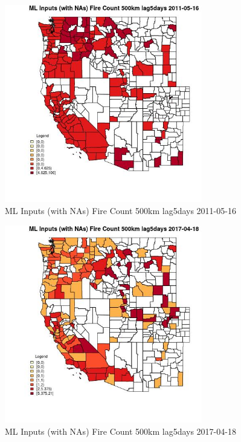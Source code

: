 \begin{figure} 
\centering  
\includegraphics[width=0.77\textwidth]{Code_Outputs/Report_ML_input_PM25_Step4_part_e_de_duplicated_aves_compiled_2019-05-21wNAs_CountyFire_Count_500km_lag5daysMean2011-05-16.jpg} 
\caption{\label{fig:Report_ML_input_PM25_Step4_part_e_de_duplicated_aves_compiled_2019-05-21wNAsCountyFire_Count_500km_lag5daysMean2011-05-16}ML Inputs (with NAs) Fire Count 500km lag5days 2011-05-16} 
\end{figure} 
 

\begin{figure} 
\centering  
\includegraphics[width=0.77\textwidth]{Code_Outputs/Report_ML_input_PM25_Step4_part_e_de_duplicated_aves_compiled_2019-05-21wNAs_CountyFire_Count_500km_lag5daysMean2017-04-18.jpg} 
\caption{\label{fig:Report_ML_input_PM25_Step4_part_e_de_duplicated_aves_compiled_2019-05-21wNAsCountyFire_Count_500km_lag5daysMean2017-04-18}ML Inputs (with NAs) Fire Count 500km lag5days 2017-04-18} 
\end{figure} 
 

